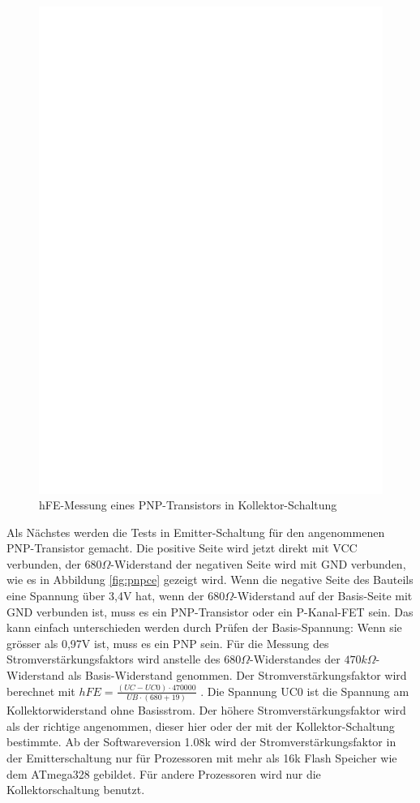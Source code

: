 \begin{figure}[H]
\centering
\includegraphics[]{../FIG/PNPcc.eps}
\caption{hFE-Messung eines PNP-Transistors in Kollektor-Schaltung}
\label{fig:pnpcc}
\end{figure}

Als Nächstes werden die Tests in Emitter-Schaltung für den angenommenen PNP-Transistor gemacht.
Die positive Seite wird jetzt direkt mit VCC verbunden, der \(680\Omega\)-Widerstand der negativen Seite wird 
mit GND verbunden, wie es in Abbildung \ref{fig:pnpce} gezeigt wird. 
Wenn die negative Seite des Bauteils eine Spannung über 3,4V hat, wenn der \(680\Omega\)-Widerstand auf der Basis-Seite mit
GND verbunden ist, muss es ein PNP-Transistor oder ein P-Kanal-FET sein.
Das kann einfach unterschieden werden durch Prüfen der Basis-Spannung: Wenn sie grösser als 0,97V ist, muss es ein PNP sein.
Für die Messung des Stromverstärkungsfaktors wird anstelle des \(680\Omega\)-Widerstandes der
 \(470k\Omega\)-Widerstand als Basis-Widerstand genommen.
Der Stromverstärkungsfaktor wird berechnet mit \(hFE = \frac{(UC-UC0) \cdot 470000}{UB \cdot (680+19)}\) .
Die Spannung UC0 ist die Spannung am Kollektorwiderstand ohne Basisstrom.
Der höhere Stromverstärkungsfaktor wird als der richtige angenommen, dieser hier oder der
mit der Kollektor-Schaltung bestimmte.
Ab der Softwareversion 1.08k wird der Stromverstärkungsfaktor in der Emitterschaltung nur für Prozessoren mit mehr
als 16k Flash Speicher wie dem ATmega328 gebildet. Für andere Prozessoren wird nur die Kollektorschaltung benutzt.


